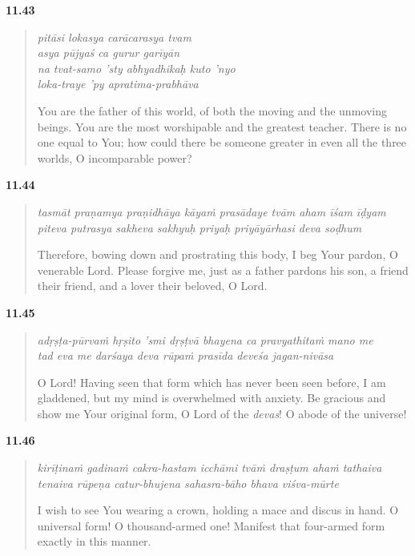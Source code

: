 \par\noindent\textbf{11.43}\par
\begin{verse}
\textit{pitāsi lokasya carācarasya tvam} \\
\textit{asya pūjyaś ca gurur garīyān} \\
\textit{na tvat-samo ’sty abhyadhikaḥ kuto ’nyo} \\
\textit{loka-traye ’py apratima-prabhāva}

\noindent You are the father of this world, of both the moving and the unmoving beings. You are the most worshipable and the greatest teacher. There is no one equal to You; how could there be someone greater in even all the three worlds, O incomparable power?
\end{verse}
\par



\par\noindent\textbf{11.44}\par
\begin{verse}
\textit{tasmāt praṇamya praṇidhāya kāyaṁ prasādaye tvām aham īśam īḍyam} \\
\textit{piteva putrasya sakheva sakhyuḥ priyaḥ priyāyārhasi deva soḍhum}

\noindent Therefore, bowing down and prostrating this body, I beg Your pardon, O venerable Lord. Please forgive me, just as a father pardons his son, a friend their friend, and a lover their beloved, O Lord.
\end{verse}
\par



\par\noindent\textbf{11.45}\par
\begin{verse}
\textit{adṛṣṭa-pūrvaṁ hṛṣito ’smi dṛṣṭvā bhayena ca pravyathitaṁ mano me} \\
\textit{tad eva me darśaya deva rūpaṁ prasīda deveśa jagan-nivāsa}

\noindent O Lord! Having seen that form which has never been seen before, I am gladdened, but my mind is overwhelmed with anxiety. Be gracious and show me Your original form, O Lord of the \textit{devas}! O abode of the universe!
\end{verse}
\par



\par\noindent\textbf{11.46}\par
\begin{verse}
\textit{kirīṭinaṁ gadinaṁ cakra-hastam icchāmi tvāṁ draṣṭum ahaṁ tathaiva} \\
\textit{tenaiva rūpeṇa catur-bhujena sahasra-bāho bhava viśva-mūrte}

\noindent I wish to see You wearing a crown, holding a mace and discus in hand. O universal form! O thousand-armed one! Manifest that four-armed form exactly in this manner.
\end{verse}
\par


